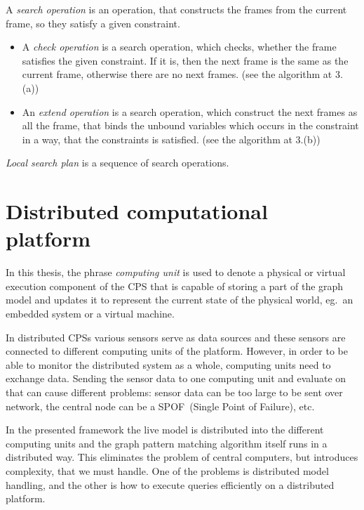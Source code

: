 A \emph{search operation} is an operation, that constructs the frames from the current frame, so they satisfy a given constraint.
\begin{itemize}
	\item 
	A \emph{check operation} is a search operation, which checks, whether the frame satisfies the given constraint. If it is, then the next frame is the same as the current frame, otherwise there are no next frames. (see the algorithm at 3.(a))
	\item
	An \emph{extend operation} is a search operation, which construct the next frames as all the frame, that binds the unbound variables which occurs in the constraint in a way, that the constraints is satisfied. (see the algorithm at 3.(b))

\end{itemize}


\emph{Local search plan} is a sequence of search operations.

\section{Distributed computational platform}


In this thesis, the phrase \emph{computing unit} is used to denote a physical or virtual execution component of the CPS that is capable of storing a part of the graph model and updates it to represent the current state of the physical world, eg.\ an embedded system or a virtual machine.

In distributed CPSs various sensors serve as data sources and these sensors are connected to different computing units of the platform. However, in order to be able to monitor the distributed system as a whole, computing units need to exchange data.
Sending the sensor data to one computing unit and evaluate on that can cause different problems: 
sensor data can be too large to be sent over network, the central node can be a SPOF~(Single Point of Failure), etc. 

In the presented framework the live model is distributed into the different computing units and the graph pattern matching algorithm itself runs in a distributed way. 
This eliminates the problem of central computers, but introduces complexity, that we must handle.
One of the problems is distributed model handling, and the other is how to execute queries efficiently on a distributed platform.




